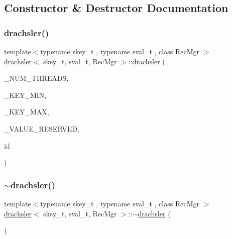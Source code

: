 \subsection{Constructor \& Destructor Documentation}
\mbox{\label{classdrachsler_ae88b80491328980a365741f26c2c1d82}} 
\subsubsection{\texorpdfstring{drachsler()}{drachsler()}}
{\footnotesize\ttfamily template$<$typename skey\+\_\+t , typename sval\+\_\+t , class Rec\+Mgr $>$ \\
\hyperlink{classdrachsler}{drachsler}$<$ skey\+\_\+t, sval\+\_\+t, Rec\+Mgr $>$\+::\hyperlink{classdrachsler}{drachsler} (\begin{DoxyParamCaption}\item[{const int}]{\+\_\+\+N\+U\+M\+\_\+\+T\+H\+R\+E\+A\+DS,  }\item[{const skey\+\_\+t \&}]{\+\_\+\+K\+E\+Y\+\_\+\+M\+IN,  }\item[{const skey\+\_\+t \&}]{\+\_\+\+K\+E\+Y\+\_\+\+M\+AX,  }\item[{const sval\+\_\+t \&}]{\+\_\+\+V\+A\+L\+U\+E\+\_\+\+R\+E\+S\+E\+R\+V\+ED,  }\item[{unsigned int}]{id }\end{DoxyParamCaption})\hspace{0.3cm}{\ttfamily [inline]}}

\mbox{\label{classdrachsler_aa0986d5204a354bdb28827955c9897e9}} 
\subsubsection{\texorpdfstring{$\sim$drachsler()}{~drachsler()}}
{\footnotesize\ttfamily template$<$typename skey\+\_\+t , typename sval\+\_\+t , class Rec\+Mgr $>$ \\
\hyperlink{classdrachsler}{drachsler}$<$ skey\+\_\+t, sval\+\_\+t, Rec\+Mgr $>$\+::$\sim$\hyperlink{classdrachsler}{drachsler} (\begin{DoxyParamCaption}{ }\end{DoxyParamCaption})\hspace{0.3cm}{\ttfamily [inline]}}



